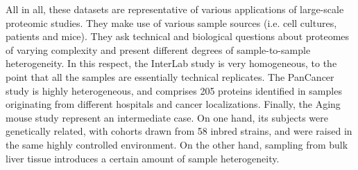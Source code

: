 \documentclass[num-refs]{wiley-article}
\begin{document}
All in all, these datasets are representative of various applications of large-scale proteomic studies. They make use of various sample sources (i.e. cell cultures, patients and mice). They ask technical and biological questions about proteomes of varying complexity and present different degrees of sample-to-sample heterogeneity. In this respect, the InterLab study is very homogeneous, to the point that all the samples are essentially technical replicates. The PanCancer study is highly heterogeneous, and comprises 205 proteins identified in samples originating from different hospitals and cancer localizations. Finally, the Aging mouse study represent an intermediate case. On one hand, its subjects were genetically related, with cohorts drawn from 58 inbred strains, and were raised in the same highly controlled environment. On the other hand, sampling from bulk liver tissue introduces a certain amount of sample heterogeneity.
\end{document}

